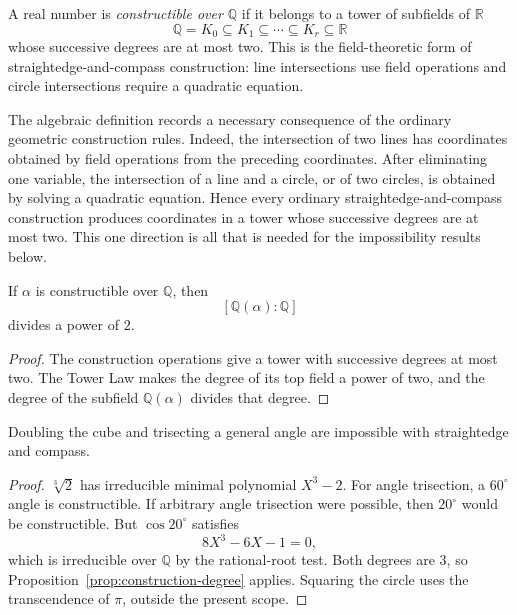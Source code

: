 \begin{definition}
A real number is \emph{constructible over \(\mathbb Q\)} if it belongs to a
tower of subfields of \(\mathbb R\)
\[
\mathbb Q=K_0\subseteq K_1\subseteq\cdots\subseteq K_r\subseteq\mathbb R
\]
whose successive degrees are at most two.  This is the field-theoretic form
of straightedge-and-compass
construction: line intersections use field operations and circle
intersections require a quadratic equation.
\end{definition}

The algebraic definition records a necessary consequence of the ordinary
geometric construction rules.  Indeed, the intersection of two lines has
coordinates obtained by field operations from the preceding coordinates.
After eliminating one variable, the intersection of a line and a circle, or
of two circles, is obtained by solving a quadratic equation.  Hence every
ordinary straightedge-and-compass construction produces coordinates in a
tower whose successive degrees are at most two.  This one direction is all
that is needed for the impossibility results below.

\begin{proposition}\label{prop:construction-degree}
If \(\alpha\) is constructible over \(\mathbb Q\), then
\[
[\mathbb Q(\alpha):\mathbb Q]
\]
divides a power of \(2\).
\end{proposition}
\begin{proof}
The construction operations give a tower with successive degrees at most two.
The Tower Law makes the degree of its top field a power of two, and the degree
of the subfield \(\mathbb Q(\alpha)\) divides that degree.
\end{proof}

\begin{corollary}
Doubling the cube and trisecting a general angle are impossible with
straightedge and compass.
\end{corollary}
\begin{proof}
\(\sqrt[3]2\) has irreducible minimal polynomial \(X^3-2\).  For angle
trisection, a \(60^\circ\) angle is constructible.  If arbitrary angle
trisection were possible, then \(20^\circ\) would be constructible.  But
\(\cos20^\circ\) satisfies
\[
8X^3-6X-1=0,
\]
which is irreducible over \(\mathbb Q\) by the rational-root test.  Both
degrees are \(3\), so Proposition~\ref{prop:construction-degree} applies.
Squaring the circle uses the transcendence of \(\pi\), outside the present
scope.
\end{proof}

